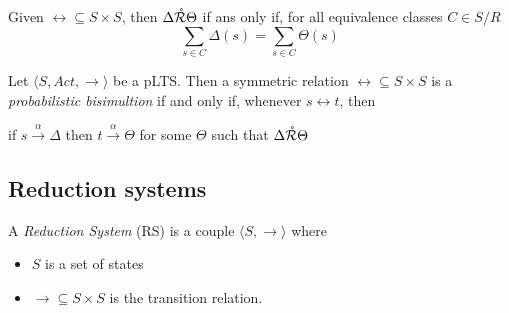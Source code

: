 Given $\rel \subseteq S \times S$, then $\Delta \mathring{\mathcal{R}} \Theta$ if ans only if, for all equivalence classes $C \in S/R$
\[\sum_{s\in C} \Delta(s) = \sum_{s\in C} \Theta(s)\]


Let $\langle S , Act, \rightarrow \rangle$ be a pLTS. Then a symmetric relation $\rel \subseteq S \times S$ is a \textit{probabilistic bisimultion} if and only if, whenever $s \rel t$, then 
\begin{center}
if $s \xrightarrow{\alpha} \Delta$ then $t \xrightarrow{\alpha} \Theta$ for some $\Theta$ such that $\Delta \mathring{\mathcal{R}} \Theta$
\end{center}

\subsection*{Reduction systems}

A \textit{Reduction System} (RS) is a couple $\langle S,  \rightarrow \rangle$ where \begin{itemize}
\item $S$ is a set of states
\item $\rightarrow 	\subseteq S\times S$ is the transition relation.
\end{itemize} 